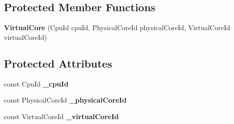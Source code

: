 \subsection*{Protected Member Functions}
\begin{DoxyCompactItemize}
\item 
\hypertarget{classmammut_1_1topology_1_1VirtualCore_ae30b9c960484969abc9b7ea8807a7e40}{{\bfseries Virtual\-Core} (Cpu\-Id cpu\-Id, Physical\-Core\-Id physical\-Core\-Id, Virtual\-Core\-Id virtual\-Core\-Id)}\label{classmammut_1_1topology_1_1VirtualCore_ae30b9c960484969abc9b7ea8807a7e40}

\end{DoxyCompactItemize}
\subsection*{Protected Attributes}
\begin{DoxyCompactItemize}
\item 
\hypertarget{classmammut_1_1topology_1_1VirtualCore_a34b200cab13ee901ea5a8b9fcc17e81a}{const Cpu\-Id {\bfseries \-\_\-cpu\-Id}}\label{classmammut_1_1topology_1_1VirtualCore_a34b200cab13ee901ea5a8b9fcc17e81a}

\item 
\hypertarget{classmammut_1_1topology_1_1VirtualCore_a9dd71de7005506fb5631891ce0144b94}{const Physical\-Core\-Id {\bfseries \-\_\-physical\-Core\-Id}}\label{classmammut_1_1topology_1_1VirtualCore_a9dd71de7005506fb5631891ce0144b94}

\item 
\hypertarget{classmammut_1_1topology_1_1VirtualCore_a86acd2c039f8d9cfde1ef3c0a58a6232}{const Virtual\-Core\-Id {\bfseries \-\_\-virtual\-Core\-Id}}\label{classmammut_1_1topology_1_1VirtualCore_a86acd2c039f8d9cfde1ef3c0a58a6232}

\end{DoxyCompactItemize}


